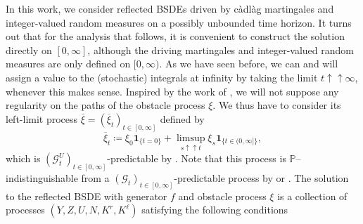 \documentclass[10pt]{article} %
\newcommand\cG{\mathcal G}
\def \P{\mathbb{P}}
\newcommand{\1}{\mathbf{1}}
\begin{document}
In this work, we consider reflected BSDEs driven by c\`adl\`ag martingales and integer-valued random measures on a possibly unbounded time horizon. It turns out that for the analysis that follows, it is convenient to construct the solution directly on $[0,\infty]$, although the driving martingales and integer-valued random measures are only defined on $[0,\infty)$. As we have seen before, we can and will assign a value to the (stochastic) integrals at infinity by taking the limit $t \uparrow\uparrow \infty$, whenever this makes sense. Inspired by the work of \citeauthor*{grigorova2020optimal} \cite{grigorova2020optimal}, we will not suppose any regularity on the paths of the obstacle process $\xi$. We thus have to consider its left-limit process $\overline\xi = (\overline\xi_t)_{t \in [0,\infty]}$ defined by
\begin{equation*}
	\overline\xi_t \coloneqq
		\xi_0\mathbf{1}_{\{t = 0\}}+\limsup_{s \uparrow\uparrow t} \xi_s\mathbf{1}_{\{t\in (0,\infty]\}}, 
\end{equation*}
which is $(\cG^U_t)_{t \in [0,\infty]}$-predictable by . Note that this process is $\P$--indistinguishable from a $(\cG_t)_{t \in [0,\infty]}$-predictable process by  or \cite[Proposition 1.1]{jacod1979calcul}. The solution to the reflected BSDE with generator $f$ and obstacle process $\xi$ is a collection of processes $(Y,Z,U,N,K^r,K^\ell)$ satisfying the following conditions
\end{document}
